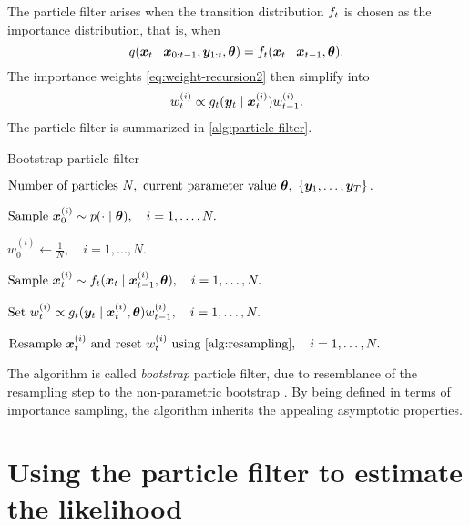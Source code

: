 The particle filter arises when the transition distribution $f_t$ is chosen as the importance distribution, that is, when
\begin{equation*}
q(\bm{x}_t \mid \bm{x}_{0:t-1}, \bm{y}_{1:t}, \bm{\theta}) = f_t(\bm{x}_t \mid \bm{x}_{t-1}, \bm{\theta}).
\end{equation*}
The importance weights \eqref{eq:weight-recursion2} then simplify into
\begin{equation} \label{eq:weight-recursion3}
w_t^{(i)} \propto g_t(\bm{y}_t \mid \bm{x}_t^{(i)}) w_{t-1}^{(i)}.
\end{equation}
The particle filter is summarized in \autoref{alg:particle-filter}.
\begin{algorithm}[ht]
    \caption{Bootstrap particle filter}
    \label{alg:particle-filter}
    \begin{algorithmic}[1]
        \Input $\text{Number of particles } N,\ \text{current parameter value } \btheta,\ \left\{\by_1, \ldots, \by_T\right\}.$
        
        \State $\text{Sample } \bm{x}_0^{(i)} \sim p(\cdot \mid \bm{\theta}), \quad i = 1, \ldots, N.$ 
        
        \State $w_0^{(i)} \gets \frac{1}{N}, \quad i = 1, \ldots, N.$ 
        
        \State $\text{Sample } \bm{x}_t^{(i)} \sim f_t(\bm{x}_t \mid \bm{x}_{t-1}^{(i)}, \bm{\theta}), \quad i = 1, \ldots, N.$ 
        
        \State $\text{Set } w_t^{(i)} \propto g_t(\bm{y}_t \mid \bm{x}_t^{(i)}, \bm{\theta}) w_{t-1}^{(i)}, \quad i = 1, \ldots, N.$ 
        
        \State $\text{Resample } \bx_t^{(i)} \text{ and reset } w_t^{(i)} \text{ using \autoref{alg:resampling}}, \quad i = 1, \ldots, N.$
        \EndFor
    \end{algorithmic}
\end{algorithm}
The algorithm is called \emph{bootstrap} particle filter, due to resemblance of the resampling step to the non-parametric bootstrap \citep{bootstrap}. By being defined in terms of importance sampling, the algorithm inherits the appealing asymptotic properties.



\section{Using the particle filter to estimate the likelihood} \label{sec:particle-filter-estimate}

